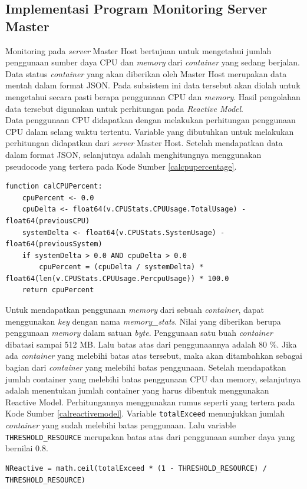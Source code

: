             \subsection{Implementasi Program Monitoring Server Master}
            	Monitoring pada \textit{server} Master Host bertujuan untuk mengetahui jumlah penggunaan sumber daya CPU dan \textit{memory} dari \textit{container} yang sedang berjalan. Data status \textit{container} yang akan diberikan oleh Master Host merupakan data mentah dalam format JSON. Pada subsistem ini data tersebut akan diolah untuk mengetahui secara pasti berapa penggunaan CPU dan \textit{memory}. Hasil pengolahan data tersebut digunakan untuk perhitungan pada \textit{Reactive Model}. \\
                \indent Data penggunaan CPU didapatkan dengan melakukan perhitungan penggunaan CPU dalam selang waktu tertentu. Variable yang dibutuhkan untuk melakukan perhitungan didapatkan dari \textit{server} Master Host. Setelah mendapatkan data dalam format JSON, selanjutnya adalah menghitungnya menggunakan pseudocode yang tertera pada Kode Sumber \ref{calcpupercentage}.\\
                \begin{lstlisting}[frame=single,tabsize=2,breaklines,caption={Pseudocode Menghitung Penggunaan CPU},label=calcpupercentage, captionpos=b]
function calCPUPercent:
    cpuPercent <- 0.0
    cpuDelta <- float64(v.CPUStats.CPUUsage.TotalUsage) - float64(previousCPU)
    systemDelta <- float64(v.CPUStats.SystemUsage) - float64(previousSystem)
    if systemDelta > 0.0 AND cpuDelta > 0.0 
        cpuPercent = (cpuDelta / systemDelta) * float64(len(v.CPUStats.CPUUsage.PercpuUsage)) * 100.0
    return cpuPercent
			\end{lstlisting}
                \indent Untuk mendapatkan penggunaan \textit{memory} dari sebuah \textit{container}, dapat menggunakan \textit{key} dengan nama \textit{memory\_stats}. Nilai yang diberikan berupa penggunaan \textit{memory} dalam satuan \textit{byte}. Penggunaan satu buah \textit{container} dibatasi sampai 512 MB. Lalu batas atas dari penggunaannya adalah 80 \%. Jika ada \textit{container} yang melebihi batas atas tersebut, maka akan ditambahkan sebagai bagian dari \textit{container} yang melebihi batas penggunaan.
                \indent Setelah mendapatkan jumlah container yang melebihi batas penggunaan CPU dan memory, selanjutnya adalah menentukan jumlah container yang harus dibentuk menggunakan Reactive Model. Perhitungannya menggunakan rumus seperti yang tertera pada Kode Sumber \ref{calreactivemodel}. Variable \texttt{totalExceed} menunjukkan jumlah \textit{container} yang sudah melebihi batas penggunaan. Lalu variable \texttt{THRESHOLD\_RESOURCE} merupakan batas atas dari penggunaan sumber daya yang bernilai 0.8.
            \begin{lstlisting}[frame=single,tabsize=2,breaklines,caption={Perhitungan \textit{Reactive Model}},label=calreactivemodel, captionpos=b]
NReactive = math.ceil(totalExceed * (1 - THRESHOLD_RESOURCE) / THRESHOLD_RESOURCE)
			\end{lstlisting}
            
